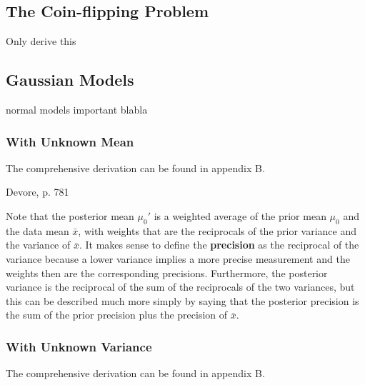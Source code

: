 \subsection{The Coin-flipping Problem}\label{sec:coin_flipping}

Only derive this

\subsection{Gaussian Models}\label{sec:gaussian_models}

normal models important blabla

\subsubsection{With Unknown Mean}

The comprehensive derivation can be found in appendix B. 

Devore, p. 781 

Note that the posterior mean $\mu_0'$ is a weighted average of the prior mean $\mu_0$ and the data mean $\bar{x}$, with weights that are the reciprocals of the prior variance and the variance of $\bar{x}$. It makes sense to define the \textbf{precision} as the reciprocal of the variance because a lower variance implies a more precise measurement and the weights then are the corresponding precisions. Furthermore, the posterior variance is the reciprocal of the sum of the reciprocals of the two variances, but this can be described much more simply by saying that the posterior precision is the sum of the prior precision plus the precision of $\bar{x}$. 

\subsubsection{With Unknown Variance}

The comprehensive derivation can be found in appendix B. 

